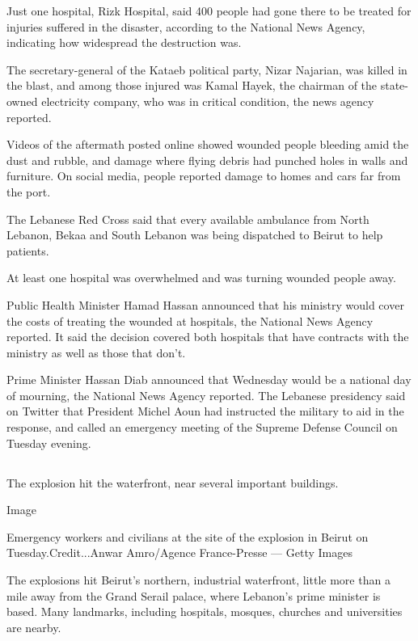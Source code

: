 Just one hospital, Rizk Hospital, said 400 people had gone there to be
treated for injuries suffered in the disaster, according to the National
News Agency, indicating how widespread the destruction was.

The secretary-general of the Kataeb political party, Nizar Najarian, was
killed in the blast, and among those injured was Kamal Hayek, the
chairman of the state-owned electricity company, who was in critical
condition, the news agency reported.

Videos of the aftermath posted online showed wounded people bleeding
amid the dust and rubble, and damage where flying debris had punched
holes in walls and furniture. On social media, people reported damage to
homes and cars far from the port.

The Lebanese Red Cross said that every available ambulance from North
Lebanon, Bekaa and South Lebanon was being dispatched to Beirut to help
patients.

At least one hospital was overwhelmed and was turning wounded people
away.

Public Health Minister Hamad Hassan announced that his ministry would
cover the costs of treating the wounded at hospitals, the National News
Agency reported. It said the decision covered both hospitals that have
contracts with the ministry as well as those that don't.

Prime Minister Hassan Diab announced that Wednesday would be a national
day of mourning, the National News Agency reported. The Lebanese
presidency said on Twitter that President Michel Aoun had instructed the
military to aid in the response, and called an emergency meeting of the
Supreme Defense Council on Tuesday evening.

\hypertarget{-3}{%
\subsection{}\label{-3}}

The explosion hit the waterfront, near several important buildings.

Image

Emergency workers and civilians at the site of the explosion in Beirut
on Tuesday.Credit...Anwar Amro/Agence France-Presse --- Getty Images

The explosions hit Beirut's northern, industrial waterfront, little more
than a mile away from the Grand Serail palace, where Lebanon's prime
minister is based. Many landmarks, including hospitals, mosques,
churches and universities are nearby.

